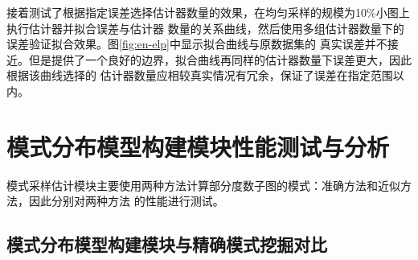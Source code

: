 \documentclass[master]{thesis-uestc}
\begin{document}
    接着测试了根据指定误差选择估计器数量的效果，在均匀采样的规模为10\%小图上执行估计器并拟合误差与估计器
数量的关系曲线，然后使用多组估计器数量下的误差验证拟合效果。图\ref{fig:en-elp}中显示拟合曲线与原数据集的
真实误差并不接近。但是提供了一个良好的边界，拟合曲线再同样的估计器数量下误差更大，因此根据该曲线选择的
估计器数量应相较真实情况有冗余，保证了误差在指定范围以内。

\section{模式分布模型构建模块性能测试与分析}
\label{sec-fitting-exp}
    模式采样估计模块主要使用两种方法计算部分度数子图的模式：准确方法和近似方法，因此分别对两种方法
的性能进行测试。

\subsection{模式分布模型构建模块与精确模式挖掘对比}
\label{subsec:fitting-cmp-accurate}
\end{document}
